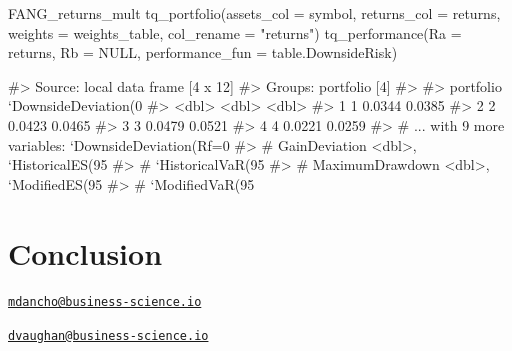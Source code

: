 \begin{Schunk}
\begin{Sinput}
FANG_returns_mult %
    tq_portfolio(assets_col = symbol, returns_col = returns,
                 weights = weights_table, col_rename = "returns") %
    tq_performance(Ra = returns, Rb = NULL, performance_fun = table.DownsideRisk)
\end{Sinput}
\begin{Soutput}
#> Source: local data frame [4 x 12]
#> Groups: portfolio [4]
#> 
#>   portfolio `DownsideDeviation(0%
#>       <dbl>                   <dbl>                        <dbl>
#> 1         1                  0.0344                       0.0385
#> 2         2                  0.0423                       0.0465
#> 3         3                  0.0479                       0.0521
#> 4         4                  0.0221                       0.0259
#> # ... with 9 more variables: `DownsideDeviation(Rf=0%
#> #   GainDeviation <dbl>, `HistoricalES(95%
#> #   `HistoricalVaR(95%
#> #   MaximumDrawdown <dbl>, `ModifiedES(95%
#> #   `ModifiedVaR(95%
\end{Soutput}
\end{Schunk}

\section{Conclusion}\label{conclusion}

\address{%
Matt Dancho\\
Business Science\\
\\
}
\href{mailto:mdancho@business-science.io}{\nolinkurl{mdancho@business-science.io}}

\address{%
Davis Vaughan\\
Business Science\\
\\
}
\href{mailto:dvaughan@business-science.io}{\nolinkurl{dvaughan@business-science.io}}


